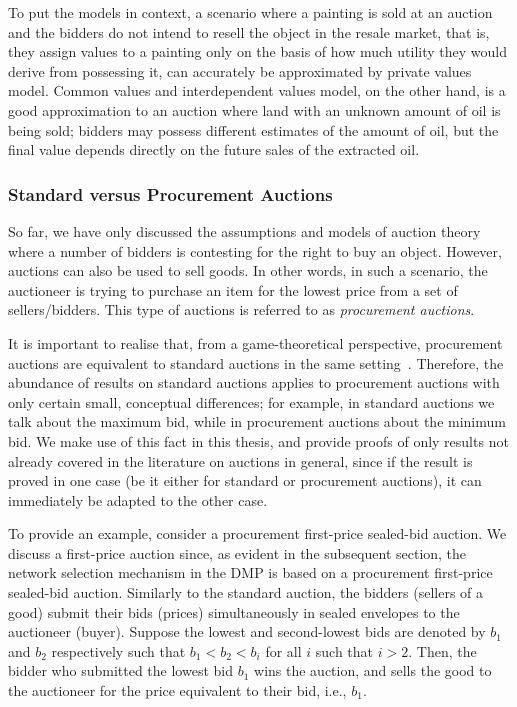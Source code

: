 To put the models in context, a scenario where a painting is sold at an auction and the bidders do not intend to resell the object in the resale market, that is, they assign values to a painting only on the basis of how much utility they would derive from possessing it, can accurately be approximated by private values model. Common values and interdependent values model, on the other hand, is a good approximation to an auction where land with an unknown amount of oil is being sold; bidders may possess different estimates of the amount of oil, but the final value depends directly on the future sales of the extracted oil.

\subsubsection{Standard versus Procurement Auctions} %
\label{ssub:standard_versus_procurement_auctions_dmp}
So far, we have only discussed the assumptions and models of auction theory where a number of bidders is contesting for the right to buy an object. However, auctions can also be used to sell goods. In other words, in such a scenario, the auctioneer is trying to purchase an item for the lowest price from a set of sellers/bidders. This type of auctions is referred to as \emph{procurement auctions}.

It is important to realise that, from a game-theoretical perspective, procurement auctions are equivalent to standard auctions in the same setting~\cite{Krishna10}. Therefore, the abundance of results on standard auctions applies to procurement auctions with only certain small, conceptual differences; for example, in standard auctions we talk about the maximum bid, while in procurement auctions about the minimum bid. We make use of this fact in this thesis, and provide proofs of only results not already covered in the literature on auctions in general, since if the result is proved in one case (be it either for standard or procurement auctions), it can immediately be adapted to the other case.

To provide an example, consider a procurement first-price sealed-bid auction. We discuss a first-price auction since, as evident in the subsequent section, the network selection mechanism in the DMP is based on a procurement first-price sealed-bid auction. Similarly to the standard auction, the bidders (sellers of a good) submit their bids (prices) simultaneously in sealed envelopes to the auctioneer (buyer). Suppose the lowest and second-lowest bids are denoted by $b_1$ and $b_2$ respectively such that $b_1 < b_2 < b_i$ for all $i$ such that $i > 2$. Then, the bidder who submitted the lowest bid $b_1$ wins the auction, and sells the good to the auctioneer for the price equivalent to their bid, i.e., $b_1$.

